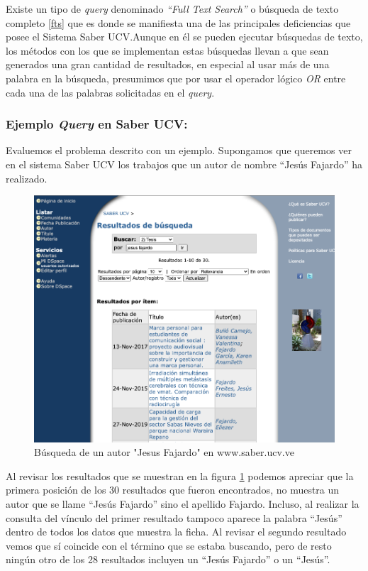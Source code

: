 \documentclass[
  10,
  openany]{book}
\begin{document}
Existe un tipo de \emph{query} denominado \emph{``Full Text Search''} o búsqueda de texto completo \ref{fts} que es donde se manifiesta una de las principales deficiencias que posee el Sistema Saber UCV.Aunque en él se pueden ejecutar búsquedas de texto, los métodos con los que se implementan estas búsquedas llevan a que sean generados una gran cantidad de resultados, en especial al usar más de una palabra en la búsqueda, presumimos que por usar el operador lógico \emph{OR} entre cada una de las palabras solicitadas en el \emph{query}.

\hypertarget{query}{%
\subsubsection{\texorpdfstring{Ejemplo \textbf{\emph{Query}} en Saber UCV:}{Ejemplo Query en Saber UCV:}}\label{query}}

Evaluemos el problema descrito con un ejemplo. Supongamos que queremos ver en el sistema Saber UCV los trabajos que un autor de nombre ``Jesús Fajardo'' ha realizado.

\begin{figure}

{\centering \includegraphics[width=0.6\linewidth]{images/01-intro/jesus_saber} 

}

\caption{Búsqueda de un autor "Jesus Fajardo" en www.saber.ucv.ve}\label{fig:busquedasaber}
\end{figure}

Al revisar los resultados que se muestran en la figura \ref{fig:busquedasaber} podemos apreciar que la primera posición de los 30 resultados que fueron encontrados, no muestra un autor que se llame ``Jesús Fajardo'' sino el apellido Fajardo. Incluso, al realizar la consulta del vínculo del primer resultado tampoco aparece la palabra ``Jesús'' dentro de todos los datos que muestra la ficha. Al revisar el segundo resultado vemos que sí coincide con el término que se estaba buscando, pero de resto ningún otro de los 28 resultados incluyen un ``Jesús Fajardo'' o un ``Jesús''.
\end{document}
